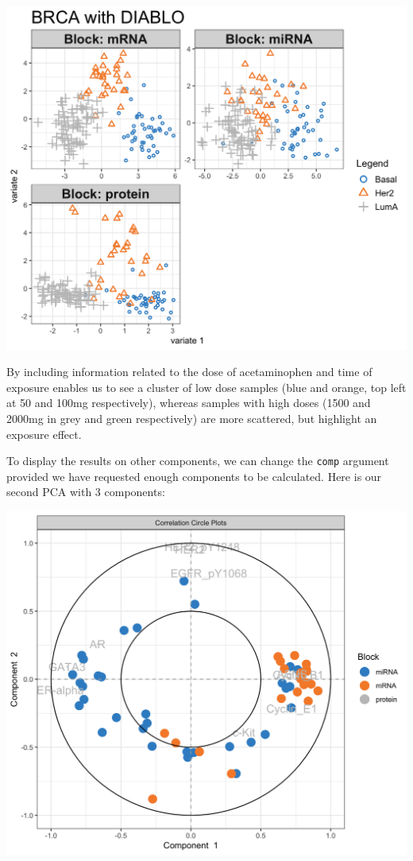 \documentclass[]{book}
\newenvironment{Shaded}{\begin{snugshade}}{\end{snugshade}}
\newcommand{\KeywordTok}[1]{\textcolor[rgb]{0.13,0.29,0.53}{\textbf{#1}}}
\newcommand{\DataTypeTok}[1]{\textcolor[rgb]{0.13,0.29,0.53}{#1}}
\newcommand{\DecValTok}[1]{\textcolor[rgb]{0.00,0.00,0.81}{#1}}
\newcommand{\StringTok}[1]{\textcolor[rgb]{0.31,0.60,0.02}{#1}}
\newcommand{\OtherTok}[1]{\textcolor[rgb]{0.56,0.35,0.01}{#1}}
\newcommand{\OperatorTok}[1]{\textcolor[rgb]{0.81,0.36,0.00}{\textbf{#1}}}
\newcommand{\NormalTok}[1]{#1}
\theoremstyle{definition}
\theoremstyle{definition}
\theoremstyle{definition}
\theoremstyle{remark}
\begin{document}
\begin{center}\includegraphics[width=0.5\linewidth]{Figures/unnamed-chunk-4-1} \end{center}

By including information related to the dose of acetaminophen and time
of exposure enables us to see a cluster of low dose samples (blue and
orange, top left at 50 and 100mg respectively), whereas samples with
high doses (1500 and 2000mg in grey and green respectively) are more
scattered, but highlight an exposure effect.

To display the results on other components, we can change the
\texttt{comp} argument provided we have requested enough components to
be calculated. Here is our second PCA with 3 components:

\begin{Shaded}
\end{Shaded}

\begin{center}\includegraphics[width=0.5\linewidth]{Figures/unnamed-chunk-5-1} \end{center}
\end{document}
